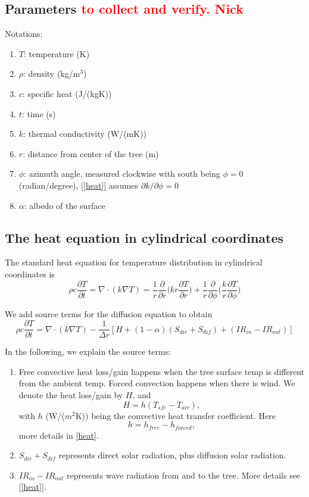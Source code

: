 \documentclass[12pt]{article}
\begin{document}
\subsection{Parameters \textcolor{red}{ to collect and verify. Nick}}
Notations: 
\begin{enumerate}
\item $T$: temperature (K)
\item $\rho$: density (kg/m$^3$)
\item $c$: specific heat (J/(kgK))
\item $t$: time (s)
\item $k$: thermal conductivity (W/(mK))
\item $r$: distance from center of the tree (m)
\item $\phi$: azimuth angle, measured clockwise with south being $\phi=0$ (radian/degree), [\ref{heat}] assumes $\partial k/\partial \phi=0$
\item $\alpha$: albedo of the surface
\end{enumerate}

\subsection{The heat equation in cylindrical coordinates}
The standard heat equation for temperature distribution in cylindrical coordinates is 
\begin{equation}
\rho c\frac{\partial T}{\partial t}=\nabla\cdot(k\nabla T)=\frac{1}{r}\frac{\partial}{\partial r}\bigg(kr\frac{\partial T}{\partial r}\bigg)+\frac{1}{r}\frac{\partial}{\partial \phi}\bigg(\frac{k}{r}\frac{\partial T}{\partial \phi}\bigg)\label{heat}
\end{equation}

We add source terms for the diffusion equation to obtain
\begin{equation}
\rho c\frac{\partial T}{\partial t}=\nabla\cdot(k\nabla T)-\frac{1}{\Delta r}[H+(1-\alpha)(S_{dir}+S_{dif})+(IR_{in}-IR_{out})]
\end{equation}

In the following, we explain the source terms: 
\begin{enumerate}
\item 
Free convective heat loss/gain happens when the tree surface temp is different from the ambient temp. Forced convection happens when there is wind. We denote the heat loss/gain by $H$, and 
\begin{equation}
H=h(T_{sfc}-T_{air}),
\end{equation}
with $h$ (W/($m^2$K)) being the convective heat transfer coefficient. Here
\begin{equation}
h=h_{free}-h_{forced},
\end{equation}
more details in \ref{heat}. 

\item $S_{dir}+S_{dif}$ represents direct solar radiation, plus diffusion solar radiation. 

\item $IR_{in}-IR_{out}$ represents wave radiation from and to the tree. More details see [\ref{heat}].

\end{enumerate}
\end{document}
